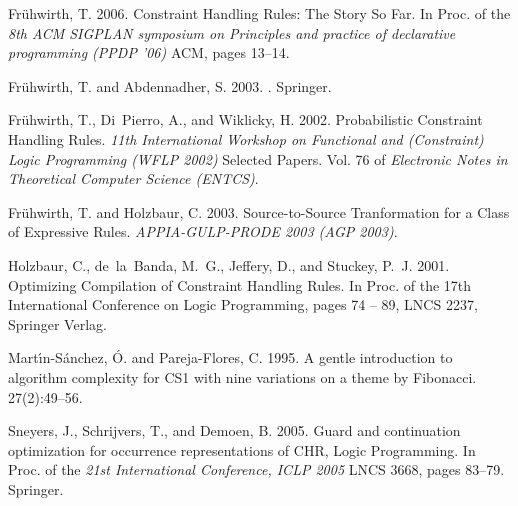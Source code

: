 \documentclass[final]{acmtrans2e}
\begin{document}
\begin{thebibliography}{}
{\sc Fr\"uhwirth, T.} 2006.
  \newblock Constraint Handling Rules: The Story So Far.
  \newblock In Proc. of the {\em 8th ACM SIGPLAN symposium on Principles and practice of declarative
  programming (PPDP '06)} ACM, pages 13--14.


{\sc Fr\"uhwirth, T.} {\sc and} {\sc
Abdennadher, S.} 2003.
.
\newblock Springer.

{\sc Fr{\"u}hwirth, T.}, {\sc Di~Pierro, A.}, {\sc and}  {\sc Wiklicky, H.} 2002.
\newblock Probabilistic Constraint Handling Rules.
\newblock \emph{11th International Workshop on Functional and (Constraint) Logic Programming (WFLP 2002)}
\newblock Selected Papers. Vol. 76 of \emph{Electronic Notes in Theoretical Computer Science (ENTCS)}.

{\sc Fr\"uhwirth, T.} {\sc and} {\sc Holzbaur, C.}  2003.
\newblock Source-to-Source Tranformation for a Class of Expressive Rules.
\newblock \emph{APPIA-GULP-PRODE 2003 (AGP 2003)}.

{\sc Holzbaur, C.}, {\sc de~la~Banda, M.~G.},  {\sc Jeffery, D.}, {\sc and} {\sc
Stuckey, P.~J.} 2001.
\newblock Optimizing Compilation of Constraint Handling Rules.
\newblock In Proc. of the 17th International Conference on Logic Programming, pages 74 -- 89, LNCS 2237, Springer Verlag.

{\sc Mart\'{\i}n-S\'{a}nchez, \'{O}.} {\sc and} {\sc Pareja-Flores, C.}  1995.
 \newblock A gentle introduction to algorithm complexity for CS1 with nine variations on a theme by Fibonacci.
 27(2):49--56.


{\sc Sneyers, J.}, {\sc Schrijvers, T.}, {\sc and}  {\sc Demoen, B.} 2005.
 \newblock Guard and continuation optimization for occurrence representations of CHR, Logic Programming.
 \newblock In Proc. of the {\em 21st International Conference, ICLP 2005} LNCS 3668, pages 83--79. Springer.


\end{thebibliography}
\end{document}
